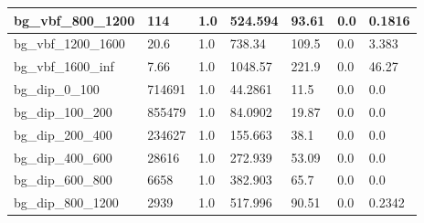 \documentclass[a4paper, 10pt]{article}
\begin{document}
\begin{table}[H]
\begin{center}
\begin{tabular}{|m{23.0mm}|m{23.0mm}|m{18.0mm}|m{19.0mm}|m{19.0mm}|m{19.0mm}|m{19.0mm}|}
      \hline
      {\cellcolor{white}         bg\_vbf\_800\_1200}& {\cellcolor{white}         114}& {\cellcolor{white}         1.0}& {\cellcolor{white}         524.594}& {\cellcolor{white}         93.61}& {\cellcolor{green}         0.0}& {\cellcolor{green}         0.1816}\\
      \hline
      {\cellcolor{white}         bg\_vbf\_1200\_1600}& {\cellcolor{white}         20.6}& {\cellcolor{white}         1.0}& {\cellcolor{white}         738.34}& {\cellcolor{white}         109.5}& {\cellcolor{green}         0.0}& {\cellcolor{green}         3.383}\\
      \hline
      {\cellcolor{white}         bg\_vbf\_1600\_inf}& {\cellcolor{white}         7.66}& {\cellcolor{white}         1.0}& {\cellcolor{white}         1048.57}& {\cellcolor{white}         221.9}& {\cellcolor{red}         0.0}& {\cellcolor{red}         46.27}\\
      \hline
      {\cellcolor{white}         bg\_dip\_0\_100}& {\cellcolor{white}         714691}& {\cellcolor{white}         1.0}& {\cellcolor{white}         44.2861}& {\cellcolor{white}         11.5}& {\cellcolor{green}         0.0}& {\cellcolor{green}         0.0}\\
      \hline
      {\cellcolor{white}         bg\_dip\_100\_200}& {\cellcolor{white}         855479}& {\cellcolor{white}         1.0}& {\cellcolor{white}         84.0902}& {\cellcolor{white}         19.87}& {\cellcolor{green}         0.0}& {\cellcolor{green}         0.0}\\
      \hline
      {\cellcolor{white}         bg\_dip\_200\_400}& {\cellcolor{white}         234627}& {\cellcolor{white}         1.0}& {\cellcolor{white}         155.663}& {\cellcolor{white}         38.1}& {\cellcolor{green}         0.0}& {\cellcolor{green}         0.0}\\
      \hline
      {\cellcolor{white}         bg\_dip\_400\_600}& {\cellcolor{white}         28616}& {\cellcolor{white}         1.0}& {\cellcolor{white}         272.939}& {\cellcolor{white}         53.09}& {\cellcolor{green}         0.0}& {\cellcolor{green}         0.0}\\
      \hline
      {\cellcolor{white}         bg\_dip\_600\_800}& {\cellcolor{white}         6658}& {\cellcolor{white}         1.0}& {\cellcolor{white}         382.903}& {\cellcolor{white}         65.7}& {\cellcolor{green}         0.0}& {\cellcolor{green}         0.0}\\
      \hline
      {\cellcolor{white}         bg\_dip\_800\_1200}& {\cellcolor{white}         2939}& {\cellcolor{white}         1.0}& {\cellcolor{white}         517.996}& {\cellcolor{white}         90.51}& {\cellcolor{green}         0.0}& {\cellcolor{green}         0.2342}\\

\end{tabular}
\end{center}
\end{table}
\end{document}
